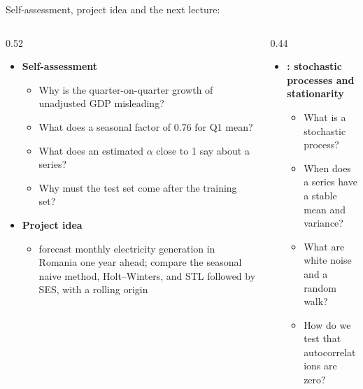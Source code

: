 \begin{frame}{Self-assessment, project idea and the next lecture: }
\itemsize{\footnotesize}
\begin{columns}[T]
\begin{column}{0.52\textwidth}
\begin{itemize}
    \item \textbf{Self-assessment}
    \begin{itemize}
        \item Why is the quarter-on-quarter growth of unadjusted GDP misleading?
        \item What does a seasonal factor of 0.76 for Q1 mean?
        \item What does an estimated $\alpha$ close to 1 say about a series?
        \item Why must the test set come after the training set?
    \end{itemize}
    \item \textbf{Project idea}
    \begin{itemize}
        \item forecast monthly electricity generation in Romania one year ahead; compare the seasonal naive method, Holt--Winters, and STL followed by SES, with a rolling origin
    \end{itemize}
\end{itemize}
\end{column}
\begin{column}{0.44\textwidth}
\begin{itemize}
    \item \textbf{: stochastic processes and stationarity}
    \begin{itemize}
        \item What is a stochastic process?
        \item When does a series have a stable mean and variance?
        \item What are white noise and a random walk?
        \item How do we test that autocorrelations are zero?
    \end{itemize}
\end{itemize}
\end{column}
\end{columns}
\end{frame}


